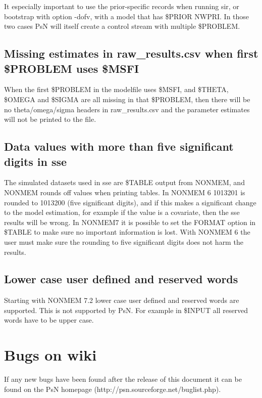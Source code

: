 It especially important to use the prior-specific records when running sir,  
or bootstrap with option -dofv,
with a model that has \$PRIOR NWPRI. In
those two cases PsN will itself create a control stream with multiple \$PROBLEM.

\subsection{Missing estimates in raw\_results.csv when first \$PROBLEM uses \$MSFI}
When the first \$PROBLEM in the modelfile uses \$MSFI, and \$THETA, \$OMEGA and \$SIGMA are all missing in that \$PROBLEM, then there will be no theta/omega/sigma headers in raw\_results.csv and the parameter estimates will not be printed to the file.

\subsection{Data values with more than five significant digits in sse}
The simulated datasets used in sse are \$TABLE output from NONMEM, and NONMEM rounds off values when printing tables. In NONMEM 6 1013201 is rounded to 1013200 (five significant digits), and if this makes a significant change to the model estimation, for example if the value is a covariate, then the sse results will be wrong. In NONMEM7 it is possible to set the FORMAT option in \$TABLE to make sure no important information is lost. With NONMEM 6 the user must make sure the rounding to five significant digits does not harm the results.

\subsection{Lower case user defined and reserved words}
Starting with NONMEM 7.2 lower case user defined and reserved words are supported. This is not supported
by PsN. For example in \$INPUT all reserved words have to be upper case.

\section{Bugs on wiki}
If any new bugs have been found after the release of this document it can be found on the PsN homepage (http://psn.sourceforge.net/buglist.php).



